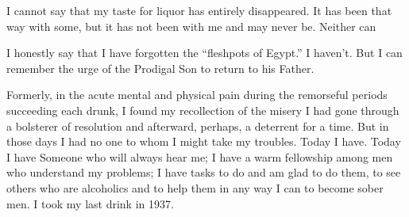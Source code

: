\begin{biblechapter}
I cannot say that my taste for liquor has entirely disappeared. It has been that way with some, but it has not been with me and may never be. Neither can

I honestly say that I have forgotten the “fleshpots of Egypt.” I haven’t. But I can remember the urge of the Prodigal Son to return to his Father.

Formerly, in the acute mental and physical pain during the remorseful periods succeeding each drunk, I found my recollection of the misery I had gone through a bolsterer of resolution and afterward, perhaps, a deterrent for a time. But in those days I had no one to whom I might take my troubles. Today I have. Today I have Someone who will always hear me; I have a warm fellowship among men who understand my problems; I have tasks to do and am glad to do them, to see others who are alcoholics and to help them in any way I can to become sober men. I took my last drink in 1937.
\end{biblechapter}
